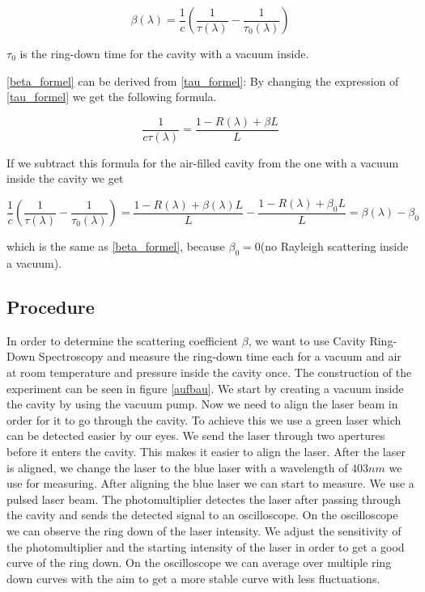 \documentclass[12pt,a4paper]{article}
\begin{document}
\begin{equation}
\beta(\lambda) = \frac{1}{c} (\frac{1}{\tau(\lambda)} - \frac{1}{\tau_0(\lambda)})
\label{beta_formel}
\end{equation}

$\tau_0$ is the ring-down time for the cavity with a vacuum inside.

\ref{beta_formel} can be derived from \ref{tau_formel}: By changing the expression of \ref{tau_formel} we get the following formula.

\begin{equation}
\frac{1}{c \tau(\lambda)} = \frac{1-R(\lambda) + \beta L}{L}
\end{equation}



If we subtract this formula for the air-filled cavity from the one with a vacuum inside the cavity we get

\begin{equation}
\frac{1}{c}(\frac{1}{\tau(\lambda)} - \frac{1}{\tau_0(\lambda)}) = \frac{1 - R(\lambda) + \beta(\lambda) L}{L} - \frac{1 - R(\lambda) + \beta_0 L}{L} = \beta(\lambda) - \beta_0
\end{equation}  

which is the same as \ref{beta_formel}, because $\beta_0 = 0$(no Rayleigh scattering inside a vacuum).

\subsection{Procedure}

In order to determine the scattering coefficient $\beta$, we want to use Cavity Ring-Down Spectroscopy and measure the ring-down time each for a vacuum and air at room temperature and pressure inside the cavity once. The construction of the experiment can be seen in figure \ref{aufbau}.
We start by creating a vacuum inside the cavity by using the vacuum pump. Now we need to align the laser beam in order for it to go through the cavity. To achieve this we use a green laser which can be detected easier by our eyes. We send the laser through two apertures before it enters the cavity. This makes it easier to align the laser. After the laser is aligned, we change the laser to the blue laser with a wavelength of $403 nm$ we use for measuring. After aligning the blue laser we can start to measure. We use a pulsed laser beam. The photomultiplier detectes the laser after passing through the cavity and sends the detected signal to an oscilloscope. On the oscilloscope we can observe the ring down of the laser intensity. We adjust the sensitivity of the photomultiplier and the starting intensity of the laser in order to get a good curve of the ring down. On the oscilloscope we can average over multiple ring down curves with the aim to get a more stable curve with less fluctuations. 
\end{document}
